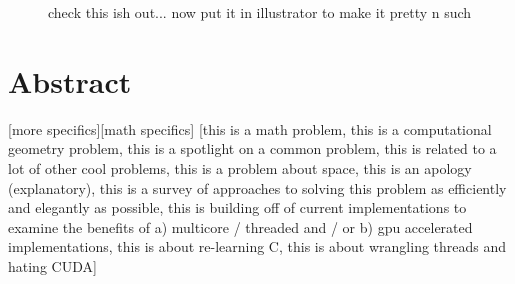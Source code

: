 \documentclass[12pt,twoside]{reedthesis}
\begin{document}
    \begin {figure}
      \begin{center}
      \caption{check this ish out... now put it in illustrator to make it pretty n such}
      
      \end{center}
    \end {figure}



    \tableofcontents
    \listofalgorithms

    \chapter*{Abstract}
    [more specifics][math specifics]
    [this is a math problem, this is a computational geometry problem, this is a spotlight on a common problem, this is related to a lot of other cool problems, this is a problem about space, this is an apology (explanatory), this is a survey of approaches to solving this problem as efficiently and elegantly as possible, this is building off of current implementations to examine the benefits of a) multicore / threaded and / or b) gpu accelerated implementations, this is about re-learning C, this is about wrangling threads and hating CUDA]
	

  \mainmatter %
  \pagestyle{fancyplain} %

\end{document}
